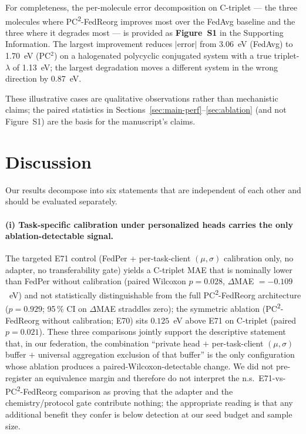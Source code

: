 \documentclass[11pt,a4paper]{article}
\newcommand{\PC}{PC\textsuperscript{2}-FedReorg}
\begin{document}
For completeness, the per-molecule error decomposition on C-triplet --- the three molecules where \PC{} improves most over the FedAvg baseline and the three where it degrades most --- is provided as \textbf{Figure~S1} in the Supporting Information. The largest improvement reduces $|\mathrm{error}|$ from \SI{3.06}{\eV} (FedAvg) to \SI{1.70}{\eV} (PC$^2$) on a halogenated polycyclic conjugated system with a true triplet-$\lambda$ of \SI{1.13}{\eV}; the largest degradation moves a different system in the wrong direction by \SI{0.87}{\eV}.

These illustrative cases are qualitative observations rather than mechanistic claims; the paired statistics in Sections~\ref{sec:main-perf}--\ref{sec:ablation} (and not Figure~S1) are the basis for the manuscript's claims.

\section{Discussion}\label{sec:discussion}

Our results decompose into six statements that are independent of each other and should be evaluated separately.

\paragraph{(i) Task-specific calibration under personalized heads carries the only ablation-detectable signal.} The targeted E71 control (FedPer + per-task-client $(\mu, \sigma)$ calibration only, no adapter, no transferability gate) yields a C-triplet MAE that is nominally lower than FedPer without calibration (paired Wilcoxon $p = 0.028$, $\Delta$MAE $= -0.109$~eV) and not statistically distinguishable from the full \PC{} architecture ($p = 0.929$; 95\,\% CI on $\Delta$MAE straddles zero); the symmetric ablation (\PC{} without calibration; E70) sits $0.125$~eV above E71 on C-triplet (paired $p = 0.021$). These three comparisons jointly support the descriptive statement that, in our federation, the combination ``private head $+$ per-task-client $(\mu, \sigma)$ buffer $+$ universal aggregation exclusion of that buffer'' is the only configuration whose ablation produces a paired-Wilcoxon-detectable change. We did not pre-register an equivalence margin and therefore do not interpret the n.s.\ E71-vs-\PC{} comparison as proving that the adapter and the chemistry/protocol gate contribute nothing; the appropriate reading is that any additional benefit they confer is below detection at our seed budget and sample size.
\end{document}

